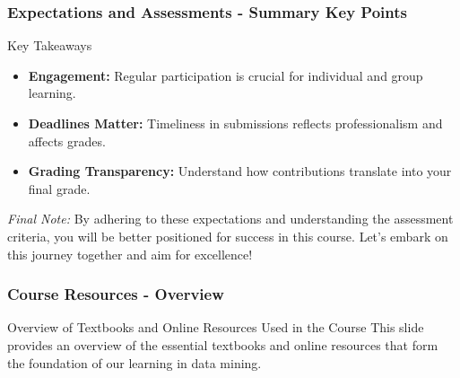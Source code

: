 \documentclass[aspectratio=169]{beamer}
\begin{document}
\begin{frame}[fragile]
  \frametitle{Expectations and Assessments - Summary Key Points}
  
  \begin{block}{Key Takeaways}
    \begin{itemize}
      \item \textbf{Engagement:} Regular participation is crucial for individual and group learning.
      \item \textbf{Deadlines Matter:} Timeliness in submissions reflects professionalism and affects grades.
      \item \textbf{Grading Transparency:} Understand how contributions translate into your final grade.
    \end{itemize}
  \end{block}
  
  \textit{Final Note:} By adhering to these expectations and understanding the assessment criteria, you will be better positioned for success in this course. Let’s embark on this journey together and aim for excellence!
\end{frame}

\begin{frame}[fragile]
    \frametitle{Course Resources - Overview}
    \begin{block}{Overview of Textbooks and Online Resources Used in the Course}
        This slide provides an overview of the essential textbooks and online resources that form the foundation of our learning in data mining.
    \end{block}
\end{frame}
\end{document}
